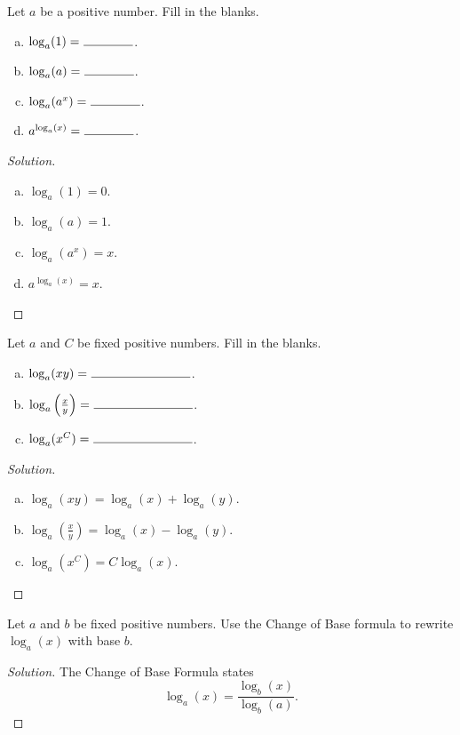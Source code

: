 \documentclass[12pt]{amsart}
\begin{document}
\begin{thm}[4 Points]\label{ex4}
  Let $a$ be a positive number.  Fill in the blanks.
  \begin{enumerate}[(a)]
  \item
    $\log_a(1) = \ \line(1,0){40}$.
  \item
    $\log_a(a) = \ \line(1,0){40}$.
  \item
    $\log_a(a^x) = \ \line(1,0){40}$.
  \item
    $a^{\log_a(x)} = \ \line(1,0){40}$.
  \end{enumerate}

  \begin{proof}[Solution]
    \begin{enumerate}[(a)]
    \item
      $\log_a(1) = 0$.
    \item
      $\log_a(a) = 1$.
    \item
      $\log_a(a^x) = x$.
    \item
      $a^{\log_a(x)} = x$.
    \end{enumerate}
  \end{proof}  
\end{thm}

\begin{thm}[3 Points]
  Let $a$ and $C$ be fixed positive numbers.  Fill in the blanks.
  \begin{enumerate}[(a)]
  \item
    $\log_a(xy) = \ \line(1,0){80}$.
  \item
    $\log_a\left(\frac{x}{y}\right) = \ \line(1,0){80}$.
  \item
    $\log_a(x^C) = \ \line(1,0){80}$.
  \end{enumerate}

  \begin{proof}[Solution]
    \begin{enumerate}[(a)]
    \item
      $\log_a(xy) = \log_a(x) + \log_a(y)$.
    \item
      $\log_a\left(\frac{x}{y}\right) = \log_a(x) - \log_a(y)$.
    \item
      $\log_a(x^C) = C \log_a(x)$.
    \end{enumerate}
  \end{proof}

\end{thm}

\begin{thm}[2 Points]
  Let $a$ and $b$ be fixed positive numbers.
  Use the Change of Base formula to rewrite $\log_a(x)$ with base $b$.

  \begin{proof}[Solution]
    The Change of Base Formula states
    $$\log_a(x) = \frac{\log_b(x)}{\log_b(a)}.$$
  \end{proof}
\end{thm}
\end{document}
